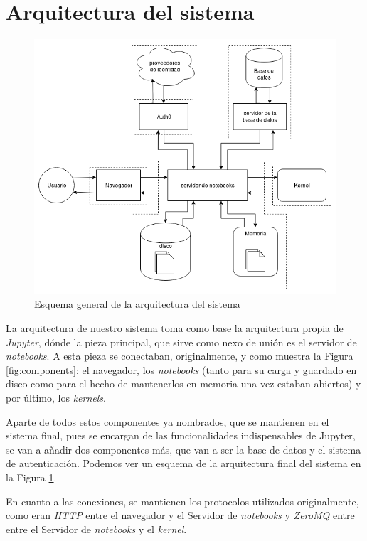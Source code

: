 \documentclass[11pt,spanish,listoffigures]{tfgetsinf}
\begin{document}

\section{Arquitectura del sistema}
\label{sec:arquitectura-sistema}

\begin{figure}[h]
	\centering
  	\includegraphics[width=1\textwidth]{Architecture.png}
  	\caption{Esquema general de la arquitectura del sistema}
  	\label{fig:general-arch}
\end{figure}

La arquitectura de nuestro sistema toma como base la arquitectura propia de \textit{Jupyter}, dónde la pieza principal, que sirve como nexo de unión es el servidor de \textit{notebooks}. A esta pieza se conectaban, originalmente, y como muestra la Figura \ref{fig:components}: el navegador, los \textit{notebooks} (tanto para su carga y guardado en disco como para el hecho de mantenerlos en memoria una vez estaban abiertos) y por último, los \textit{kernels}.

Aparte de todos estos componentes ya nombrados, que se mantienen en el sistema final, pues se encargan de las funcionalidades indispensables de Jupyter, se van a añadir dos componentes más, que van a ser la base de datos y el sistema de autenticación. Podemos ver un esquema de la arquitectura final del sistema en la Figura \ref{fig:general-arch}.

En cuanto a las conexiones, se mantienen los protocolos utilizados originalmente, como eran \textit{HTTP} entre el navegador y el Servidor de \textit{notebooks} y \textit{ZeroMQ} entre entre el Servidor de \textit{notebooks} y el \textit{kernel}. 
\end{document}
